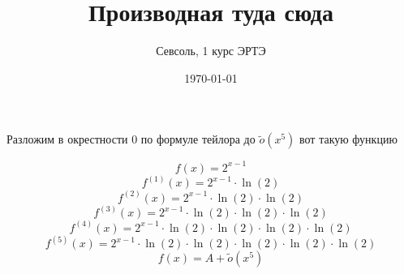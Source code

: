 \documentclass[12pt, a4paper]{article}
\begin{document}
\title{Производная туда сюда
}\author{Севсоль, 1 курс ЭРТЭ}
\date{\today}
\maketitle 
\centerline{Разложим в окрестности 0 по формуле тейлора до $\tilde{o}(x^5)$ вот такую функцию} 
\begin{equation}
f(x) = {2}^{x-1}
\end{equation}
\begin{equation}
{f}^{(1)}(x) = {2}^{x-1} \cdot \ln(2)\end{equation}\begin{equation}
{f}^{(2)}(x) = {2}^{x-1} \cdot \ln(2) \cdot \ln(2)\end{equation}\begin{equation}
{f}^{(3)}(x) = {2}^{x-1} \cdot \ln(2) \cdot \ln(2) \cdot \ln(2)\end{equation}\begin{equation}
{f}^{(4)}(x) = {2}^{x-1} \cdot \ln(2) \cdot \ln(2) \cdot \ln(2) \cdot \ln(2)\end{equation}\begin{equation}
{f}^{(5)}(x) = {2}^{x-1} \cdot \ln(2) \cdot \ln(2) \cdot \ln(2) \cdot \ln(2) \cdot \ln(2)\end{equation}
\begin{equation}f(x) = A + \tilde{o}(x^5)
\end{equation}
\end{document}
